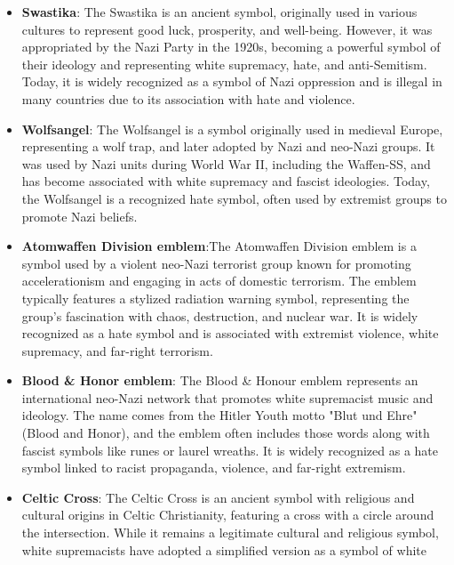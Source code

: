 \documentclass[11pt,a4paper,onecolumn]{article}
\begin{document}
\begin{itemize}
  and support for Adolf Hitler's rise to power. The emblem typically featured
  a stylized version of the SA initials, often accompanied by a swastika.
  It represented the SA's role in enforcing Nazi ideology and intimidation,
  and the emblem is now recognized as a symbol of hate and fascism.
  \item \textbf{Swastika}: The Swastika is an ancient symbol, originally used in
  various cultures to represent good luck, prosperity, and well-being. However,
  it was appropriated by the Nazi Party in the 1920s, becoming a powerful
  symbol of their ideology and representing white supremacy, hate, and
  anti-Semitism. Today, it is widely recognized as a symbol of Nazi oppression
  and is illegal in many countries due to its association with hate and violence.
  \item \textbf{Wolfsangel}: The Wolfsangel is a symbol originally used in medieval
  Europe, representing a wolf trap, and later adopted by Nazi and neo-Nazi
  groups. It was used by Nazi units during World War II, including the Waffen-SS,
  and has become associated with white supremacy and fascist ideologies. Today,
  the Wolfsangel is a recognized hate symbol, often used by extremist groups
  to promote Nazi beliefs.
  \item \textbf{Atomwaffen Division emblem}:The Atomwaffen Division emblem is a symbol
  used by a violent neo-Nazi terrorist group known for promoting accelerationism and
  engaging in acts of domestic terrorism. The emblem typically features a stylized
  radiation warning symbol, representing the group's fascination with chaos,
  destruction, and nuclear war. It is widely recognized as a hate symbol and is
  associated with extremist violence, white supremacy, and far-right terrorism.
  \item \textbf{Blood \& Honor emblem}: The Blood \& Honour emblem represents an international
  neo-Nazi network that promotes white supremacist music and ideology. The name comes
  from the Hitler Youth motto "Blut und Ehre" (Blood and Honor), and the emblem often
  includes those words along with fascist symbols like runes or laurel wreaths. It
  is widely recognized as a hate symbol linked to racist propaganda, violence,
  and far-right extremism.
  \item \textbf{Celtic Cross}: The Celtic Cross is an ancient symbol with religious
  and cultural origins in Celtic Christianity, featuring a cross with a circle
  around the intersection. While it remains a legitimate cultural and religious
  symbol, white supremacists have adopted a simplified version as a symbol of white

\end{itemize}
\end{document}

